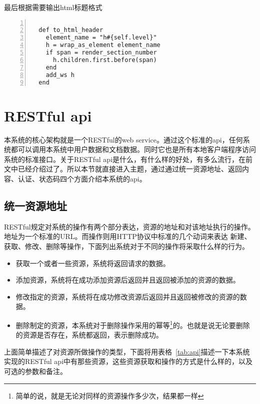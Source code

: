 最后根据需要输出html标题格式

\begin{lstlisting}[language={[ANSI]C}, numbers=left, numberstyle=\tiny, keywordstyle=\color{blue!70}, commentstyle=\color{red!50!green!50!blue!50}, frame=shadowbox, rulesepcolor=\color{red!20!green!20!blue!20}]

  def to_html_header
    element_name = "h#{self.level}"
    h = wrap_as_element element_name
    if span = render_section_number
      h.children.first.before(span)
    end
    add_ws h
  end

\end{lstlisting}

\section{RESTful api}
\label{sec:apitable}

本系统的核心架构就是一个RESTful的web service。通过这个标准的api，任何系统都可以调用本系统中用户数据和文档数据。同时它也是所有本地客户端程序访问系统的标准接口。关于RESTful api是什么，有什么样的好处，有多么流行，在前文中已经介绍过了。所以本节就直接进入主题，通过通过统一资源地址、返回内容、认证、状态码四个方面介绍本系统的api。
\subsection{统一资源地址}
\label{sec:researchurl}
RESTful规定对系统的操作有两个部分表达，资源的地址和对该地址执行的操作。地址为一个标准的URL。而操作则用HTTP协议中标准的几个动词来表达 新建、获取、修改、删除等操作，下面列出系统对于不同的操作将采取什么样的行为。
\begin{itemize}
\item {} 获取一个或者一些资源，系统将返回请求的数据。
\item {} 添加资源，系统将在成功添加资源后返回并且返回被添加的资源的数据。
\item {} 修改指定的资源，系统将在成功修改资源后返回并且返回被修改的资源的数据。
\item {} 删除制定的资源，本系统对于删除操作采用的幂等\footnote{简单的说，就是无论对同样的资源操作多少次，结果都一样}的。也就是说无论要删除的资源是否存在，系统都返回，表示删除成功。
\end{itemize}


上面简单描述了对资源所做操作的类型，下面将用表格~\ref{tab:api}描述一下本系统实现的RESTful api中有那些资源，这些资源获取和操作的方式是什么样的，以及可选的参数和备注。

